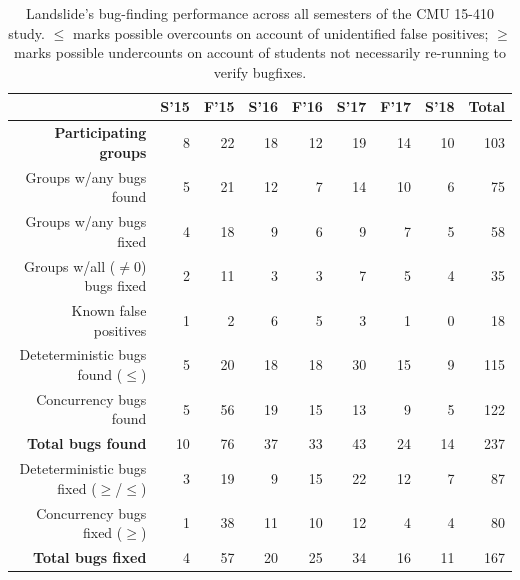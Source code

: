\begin{table}[t]
	\begin{center}
		\small
	\begin{tabular}{r||r|r|r|r|r|r|r||r}
			& \bf S'15 & \bf F'15 & \bf S'16 & \bf F'16 & \bf S'17 & \bf F'17 & \bf S'18 & \bf Total \\
			\hline
			\bf Participating groups& 8	& 22	& 18	& 12	& 19	& 14	& 10	& 103	\\
			Groups w/any bugs found	& 5	& 21	& 12	& 7	& 14	& 10	& 6	& 75	\\
			Groups w/any bugs fixed	& 4	& 18	& 9	& 6	& 9	& 7	& 5	& 58	\\
			Groups w/all ($\ne$0) bugs fixed
						& 2	& 11	& 3	& 3	& 7	& 5	& 4	& 35	\\
			\hline

			Known false positives	& 1	& 2	& 6	& 5	& 3	& 1	& 0	& 18 	\\
			\hline
			Deteterministic bugs found ($\le$)
						& 5	& 20	& 18	& 18	& 30	& 15	& 9	& 115	\\
			Concurrency bugs found	& 5	& 56	& 19	& 15	& 13	& 9	& 5	& 122	\\
			\bf Total bugs found	& 10	& 76	& 37	& 33	& 43	& 24	& 14	& 237	\\
			\hline
			Deteterministic bugs fixed ($\ge$/$\le$)
						& 3	& 19	& 9	& 15	& 22	& 12	& 7	& 87	\\
			Concurrency bugs fixed ($\ge$)
						& 1	& 38	& 11	& 10	& 12	& 4	& 4	& 80	\\
			\bf Total bugs fixed	& 4	& 57	& 20	& 25	& 34	& 16	& 11	& 167	\\
	\end{tabular}
	\end{center}
	\caption{Landslide's bug-finding performance across all semesters of the CMU 15-410 study.
	$\le$ marks possible overcounts on account of unidentified false positives;
	$\ge$ marks possible undercounts on account of students not necessarily re-running to verify bugfixes.}
	\label{tab:cmubugs}
\end{table}

